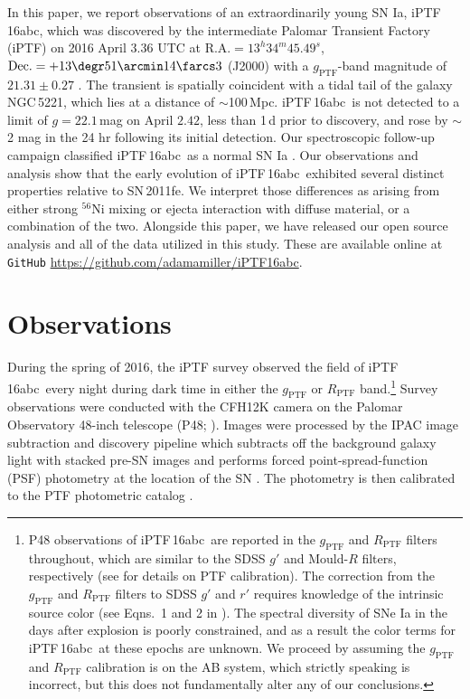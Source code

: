 \documentclass[twocolumn]{aastex61}
\newcommand{\abc}{iPTF\,16abc}
\begin{document}
In this paper, we report observations of an extraordinarily young SN Ia, \abc, which was discovered by the intermediate Palomar Transient Factory (iPTF) on 2016 April $3.36$ UTC at $\textrm{R.A.}=13^h34^m45.49^s$, $\textrm{Dec.}=+13\degr51\arcmin14\farcs3$ (J2000) with a $g_\mathrm{PTF}$-band magnitude of $21.31\pm0.27$ \citep{2016ATel.8907....1M}. The transient is spatially coincident with a tidal tail of the galaxy NGC\,5221, which lies at a distance of $\sim$100\,Mpc. \abc\ is not detected to a limit of $g=22.1$\,mag on April $2.42$, less than 1\,d prior to discovery, and rose by $\sim$2 mag in the 24 hr following its initial detection. Our spectroscopic follow-up
campaign classified \abc\ as a normal SN Ia
\citep{2016ATel.8909....1C}. Our observations and analysis show that the early evolution of \abc\ exhibited several distinct properties relative to SN\,2011fe. We interpret those differences as arising from either strong $^{56}$Ni mixing or ejecta interaction with diffuse material, or a combination of the two.
Alongside this paper, we have released our open source analysis and all of the data utilized in this study. These are available online at \texttt{GitHub} \url{https://github.com/adamamiller/iPTF16abc}.



\section{Observations}
\label{sec:obs}

During the spring of 2016, the iPTF survey observed the field of \abc\ every night during dark time in either the $g_\mathrm{PTF}$ or 
$R_\mathrm{PTF}$ band.\footnote{P48 observations of \abc\ are reported in the $g_\mathrm{PTF}$ and $R_\mathrm{PTF}$ filters throughout, which are similar to the SDSS $g'$ and Mould-$R$ filters, respectively (see \citealt{2012PASP..124..854O} for details on PTF calibration). The correction from the $g_\mathrm{PTF}$ and $R_\mathrm{PTF}$ filters to SDSS $g'$ and $r'$ requires knowledge of the intrinsic source color (see Eqns.~1 and 2 in \citealt{2012PASP..124..854O}). The spectral diversity of SNe Ia in the days after explosion is poorly constrained, and as a result the color terms for \abc\ at these epochs are unknown. We proceed by assuming the $g_\mathrm{PTF}$ and $R_\mathrm{PTF}$ calibration is on the AB system, which strictly speaking is incorrect, but this does not fundamentally alter any of our conclusions.} 
Survey observations were conducted with the
CFH12K camera \citep{2008SPIE.7014E..4YR} on the Palomar Observatory 
48-inch telescope (P48; \citealt{2009PASP..121.1395L}). Images were processed by the IPAC image
subtraction and discovery pipeline which subtracts off the background
galaxy light with stacked pre-SN images and performs forced
point-spread-function (PSF) photometry at the location of the SN 
\citep{2017PASP..129a4002M}. The
photometry is then calibrated to the PTF photometric catalog
\citep{2012PASP..124..854O}.
\end{document}
